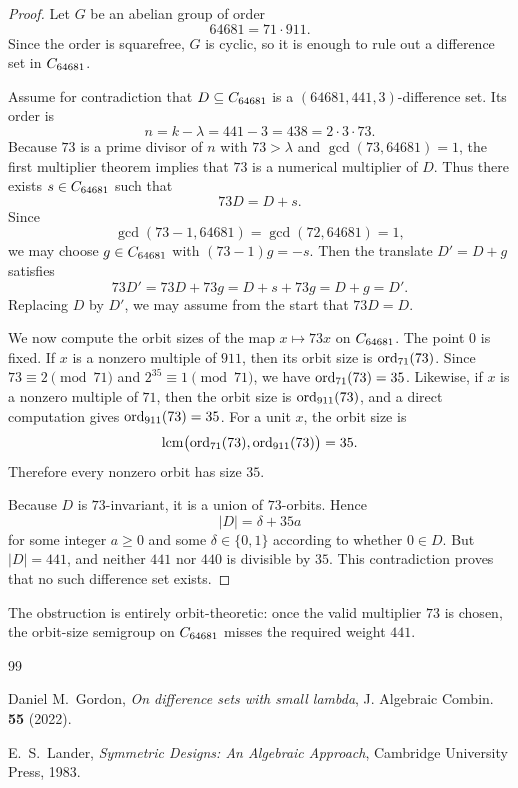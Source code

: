 \documentclass[11pt]{amsart}
\begin{document}
\begin{proof}
Let $G$ be an abelian group of order
\[
64681 = 71\cdot 911.
\]
Since the order is squarefree, $G$ is cyclic, so it is enough to rule out a difference set in $C_{64681}$.

Assume for contradiction that $D\subseteq C_{64681}$ is a $(64681,441,3)$-difference set.
Its order is
\[
n=k-\lambda=441-3=438=2\cdot 3\cdot 73.
\]
Because $73$ is a prime divisor of $n$ with $73>\lambda$ and $\gcd(73,64681)=1$, the first multiplier theorem implies that $73$ is a numerical multiplier of $D$.
Thus there exists $s\in C_{64681}$ such that
\[
73D=D+s.
\]
Since
\[
\gcd(73-1,64681)=\gcd(72,64681)=1,
\]
we may choose $g\in C_{64681}$ with $(73-1)g=-s$.
Then the translate $D'=D+g$ satisfies
\[
73D'=73D+73g=D+s+73g=D+g=D'.
\]
Replacing $D$ by $D'$, we may assume from the start that $73D=D$.

We now compute the orbit sizes of the map $x\mapsto 73x$ on $C_{64681}$.
The point $0$ is fixed.
If $x$ is a nonzero multiple of $911$, then its orbit size is $\operatorname{ord}_{71}(73)$.
Since $73\equiv 2\pmod{71}$ and $2^{35}\equiv 1\pmod{71}$, we have $\operatorname{ord}_{71}(73)=35$.
Likewise, if $x$ is a nonzero multiple of $71$, then the orbit size is $\operatorname{ord}_{911}(73)$, and a direct computation gives $\operatorname{ord}_{911}(73)=35$.
For a unit $x$, the orbit size is
\[
\operatorname{lcm}\bigl(\operatorname{ord}_{71}(73),\operatorname{ord}_{911}(73)\bigr)=35.
\]
Therefore every nonzero orbit has size $35$.

Because $D$ is $73$-invariant, it is a union of $73$-orbits.
Hence
\[
|D|=\delta+35a
\]
for some integer $a\ge 0$ and some $\delta\in\{0,1\}$ according to whether $0\in D$.
But $|D|=441$, and neither $441$ nor $440$ is divisible by $35$.
This contradiction proves that no such difference set exists.
\end{proof}

\begin{remark}
The obstruction is entirely orbit-theoretic: once the valid multiplier $73$ is chosen, the orbit-size semigroup on $C_{64681}$ misses the required weight $441$.
\end{remark}

\begin{thebibliography}{99}

Daniel M.~Gordon,
\emph{On difference sets with small lambda},
J. Algebraic Combin. \textbf{55} (2022).

E.~S.~Lander,
\emph{Symmetric Designs: An Algebraic Approach},
Cambridge University Press, 1983.

\end{thebibliography}
\end{document}
